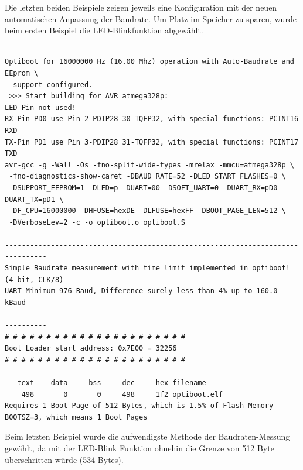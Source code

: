 Die letzten beiden Beispiele zeigen jeweils eine Konfiguration mit der neuen automatischen Anpassung der Baudrate.
Um Platz im Speicher zu sparen, wurde beim ersten Beispiel die LED-Blinkfunktion abgewählt.

\begin{verbatim}

Optiboot for 16000000 Hz (16.00 Mhz) operation with Auto-Baudrate and EEprom \
  support configured.
 >>> Start building for AVR atmega328p:
LED-Pin not used!
RX-Pin PD0 use Pin 2-PDIP28 30-TQFP32, with special functions: PCINT16 RXD
TX-Pin PD1 use Pin 3-PDIP28 31-TQFP32, with special functions: PCINT17 TXD
avr-gcc -g -Wall -Os -fno-split-wide-types -mrelax -mmcu=atmega328p \
 -fno-diagnostics-show-caret -DBAUD_RATE=52 -DLED_START_FLASHES=0 \
 -DSUPPORT_EEPROM=1 -DLED=p -DUART=00 -DSOFT_UART=0 -DUART_RX=pD0 -DUART_TX=pD1 \
 -DF_CPU=16000000 -DHFUSE=hexDE -DLFUSE=hexFF -DBOOT_PAGE_LEN=512 \
 -DVerboseLev=2 -c -o optiboot.o optiboot.S

--------------------------------------------------------------------------------
Simple Baudrate measurement with time limit implemented in optiboot! (4-bit, CLK/8)
UART Minimum 976 Baud, Difference surely less than 4% up to 160.0 kBaud
--------------------------------------------------------------------------------
# # # # # # # # # # # # # # # # # # # # # #
Boot Loader start address: 0x7E00 = 32256
# # # # # # # # # # # # # # # # # # # # # #

   text	   data	    bss	    dec	    hex	filename
    498	      0	      0	    498	    1f2	optiboot.elf
Requires 1 Boot Page of 512 Bytes, which is 1.5% of Flash Memory
BOOTSZ=3, which means 1 Boot Pages

\end{verbatim}

Beim letzten Beispiel wurde die aufwendigste Methode der Baudraten-Messung
gewählt, da mit der LED-Blink Funktion ohnehin die Grenze von 512 Byte
überschritten würde (534 Bytes).

